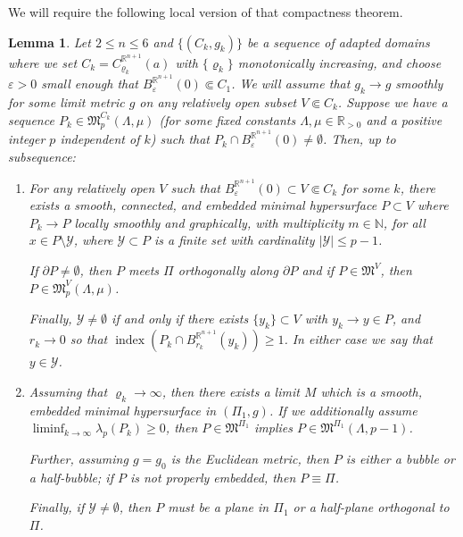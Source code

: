\documentclass[JEP,XML,SOM,Unicode]{cedram}
\let\mathcal\mathscr
\newcounter{cas}
\DeclareMathOperator{\indx}{index}
\newtheorem{lem}[thm]{Lemma}
\theoremstyle{definition}
\newcommand{\R}{\mathbb{R}}
\newcommand{\N}{\mathbb{N}}
\let\eps\varepsilon
\let\cemb\Subset
\begin{document}
We will require the following local version of that compactness theorem.

\begin{lem}\label{lemma:local}
Let $2\leq n \leq 6$ and $\{(C_{k}, g_k)\}$ be a sequence of adapted domains where we set $C_k=C^{\R^{n+1}}_{\varrho_k}(a)$ with $\{\varrho_k\}$ monotonically increasing, and choose $\eps >0$ small enough that $B^{\R^{n+1}}_\eps(0)\cemb C_1$. We will assume that $g_k\to g$ smoothly for some limit metric $g$ on any relatively open subset $V\cemb C_k$. Suppose we have a sequence $P_k\in \mathfrak{M}^{C_k}_p(\Lambda,\mu)$ (for some fixed constants $\Lambda, \mu\in \R_{>0}$ and a positive integer $p$ independent of $k$) such that $P_k\cap B^{\R^{n+1}}_{\eps}(0)\neq \emptyset$.
Then, up to subsequence:

\begin{enumerate}
\item For\label{lemma:local1} any relatively open $V$ such that $B_\eps^{\R^{n+1}}(0)\subset V\cemb C_k$ for some $k$, there exists a smooth, connected, and embedded minimal hypersurface $P\subset V$ where $P_k \to P$ locally smoothly and graphically, with multiplicity $m\in \N$, for all $x\in P\setminus \mathcal{Y}$, where $\mathcal{Y}\subset P$ is a finite set with cardinality $|\mathcal{Y}|\leq p-1$.

If $\partial P\neq\emptyset$, then $P$ meets $\Pi$ orthogonally along $\partial P$ and if $P \in \mathfrak{M}^V$, then $P \in \mathfrak{M}^V_p(\Lambda,\mu)$.

Finally, $\mathcal{Y}\neq \emptyset$ if and only if there exists $\{y_k\}\subset V$ with $y_k\to y\in P$, and $r_k\to 0$ so that $\indx(P_k\cap B^{\R^{n+1}}_{r_k}(y_k))\geq 1$. In either case we say that $y\in \mathcal{Y}$.

\item\label{lemma:local2} Assuming that $\varrho_k \to \infty$, then there exists a limit $M$ which is a smooth, embedded minimal hypersurface in $(\Pi_1,g)$.
If we additionally assume $\liminf_{k\to\infty}\lambda_p(P_k)\!\geq\!0$, then $P \in \mathfrak{M}^{\Pi_1}$ implies $P \in \mathfrak{M}^{\Pi_1}(\Lambda,p-1)$.

Further, assuming $g=g_0$ is the Euclidean metric, then $P$ is either a bubble or a half-bubble; if $P$ is not properly embedded, then $P\equiv \Pi$.

Finally, if $\mathcal{Y}\neq \emptyset$, then $P$ must be a plane in $\Pi_1$ or a half-plane orthogonal to $\Pi$.
\end{enumerate}
\end{lem}
\end{document}
